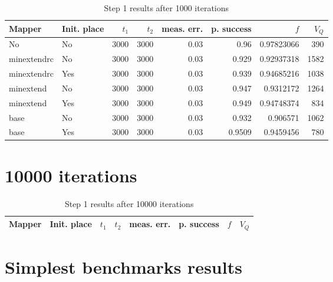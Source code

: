 \documentclass[11pt]{article}
\begin{document}
\begin{table}[htbp]
\caption{\label{tab:org9793b85}
Step 1 results after 1000 iterations}
\centering
\begin{tabular}{llrrrrrr}
\hline
Mapper & Init. place & \(t_1\) & \(t_2\) & meas. err. & p. success & \(f\) & \(V_Q\)\\
\hline
No & No & 3000 & 3000 & 0.03 & 0.96 & 0.97823066 & 390\\
\hline
minextendrc & No & 3000 & 3000 & 0.03 & 0.929 & 0.92937318 & 1582\\
minextendrc & Yes & 3000 & 3000 & 0.03 & 0.939 & 0.94685216 & 1038\\
minextend & No & 3000 & 3000 & 0.03 & 0.947 & 0.9312172 & 1264\\
minextend & Yes & 3000 & 3000 & 0.03 & 0.949 & 0.94748374 & 834\\
base & No & 3000 & 3000 & 0.03 & 0.932 & 0.906571 & 1062\\
base & Yes & 3000 & 3000 & 0.03 & 0.9509 & 0.9459456 & 780\\
\hline
\end{tabular}
\end{table}

\section{10000 iterations}
\label{sec:org2e6829d}

\begin{table}[htbp]
\caption{\label{tab:org76bac05}
Step 1 results after 10000 iterations}
\centering
\begin{tabular}{llllllll}
\hline
Mapper & Init. place & \(t_1\) & \(t_2\) & meas. err. & p. success & \(f\) & \(V_Q\)\\
\hline
\end{tabular}
\end{table}
\section{Simplest benchmarks results}
\label{sec:org4d67232}
\end{document}

